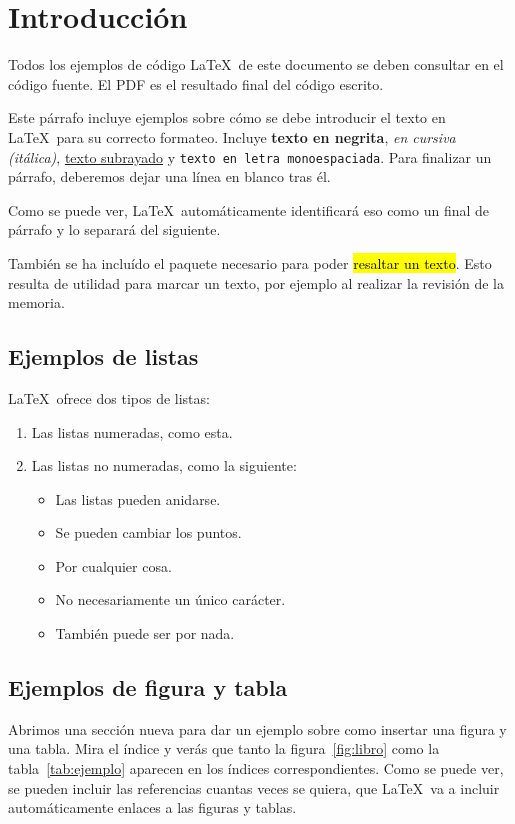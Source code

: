 \documentclass[../main.tex]{subfiles}
\begin{document}
\chapter{Introducción}
\label{C:introduccion}

Todos los ejemplos de código \LaTeX\ de este documento se deben consultar en el código fuente. El PDF es el resultado final del código escrito.

Este párrafo incluye ejemplos sobre cómo se debe introducir el texto en \LaTeX\  para su correcto formateo. Incluye \textbf{texto en negrita}, \textit{en cursiva (itálica)}, \underline{texto subrayado} y \texttt{texto en letra monoespaciada}. Para finalizar un párrafo, deberemos dejar una línea en blanco tras él.

Como se puede ver, \LaTeX\ automáticamente identificará eso como un final de párrafo y lo separará del siguiente.

También se ha incluído el paquete necesario para poder \hl{resaltar un texto}. Esto resulta de utilidad para marcar un texto, por ejemplo al realizar la revisión de la memoria.

\section{Ejemplos de listas}

\LaTeX\ ofrece dos tipos de listas:

\begin{enumerate}
    \item Las listas numeradas, como esta.
    \item Las listas no numeradas, como la siguiente:
    \begin{itemize}
        \item Las listas pueden anidarse.
        \item Se pueden cambiar los puntos.
        \item[!] Por cualquier cosa.
        \item[NOTA] No necesariamente un único carácter.
        \item[] También puede ser por nada.
    \end{itemize}
\end{enumerate}

\section{Ejemplos de figura y tabla}

Abrimos una sección nueva para dar un ejemplo sobre como insertar una figura y una tabla. Mira el índice y verás que tanto la figura~\ref{fig:libro} como la tabla~\ref{tab:ejemplo} aparecen en los índices correspondientes. Como se puede ver, se pueden incluir las referencias cuantas veces se quiera, que \LaTeX\ va a incluir automáticamente enlaces a las figuras y tablas.
\end{document}
